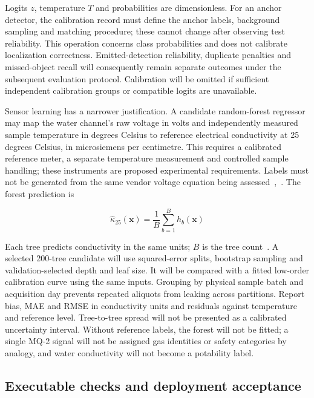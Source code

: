 \documentclass[11pt,letterpaper]{article}
\begin{document}
Logits \(z\), temperature \(T\) and probabilities are dimensionless. For an anchor detector, the calibration record must define the anchor labels, background sampling and matching procedure; these cannot change after observing test reliability. This operation concerns class probabilities and does not calibrate localization correctness. Emitted-detection reliability, duplicate penalties and missed-object recall will consequently remain separate outcomes under the subsequent evaluation protocol. Calibration will be omitted if sufficient independent calibration groups or compatible logits are unavailable.

Sensor learning has a narrower justification. A candidate random-forest regressor may map the water channel's raw voltage in volts and independently measured sample temperature in degrees Celsius to reference electrical conductivity at 25 degrees Celsius, in microsiemens per centimetre. This requires a calibrated reference meter, a separate temperature measurement and controlled sample handling; these instruments are proposed experimental requirements. Labels must not be generated from the same vendor voltage equation being assessed~\cite{ENG_TDS_CODE},~\cite{ENG_USGS_EC}. The forest prediction is

\begin{equation}
\widehat{\kappa}_{25}(\mathbf{x})=\frac{1}{B}\sum_{b=1}^{B}h_b(\mathbf{x})
\label{eq:24}
\end{equation}

Each tree predicts conductivity in the same units; \(B\) is the tree count~\cite{ENG_RANDOMFOREST}. A selected 200-tree candidate will use squared-error splits, bootstrap sampling and validation-selected depth and leaf size. It will be compared with a fitted low-order calibration curve using the same inputs. Grouping by physical sample batch and acquisition day prevents repeated aliquots from leaking across partitions. Report bias, MAE and RMSE in conductivity units and residuals against temperature and reference level. Tree-to-tree spread will not be presented as a calibrated uncertainty interval. Without reference labels, the forest will not be fitted; a single MQ-2 signal will not be assigned gas identities or safety categories by analogy, and water conductivity will not become a potability label.

\subsection{Executable checks and deployment acceptance}
\end{document}
